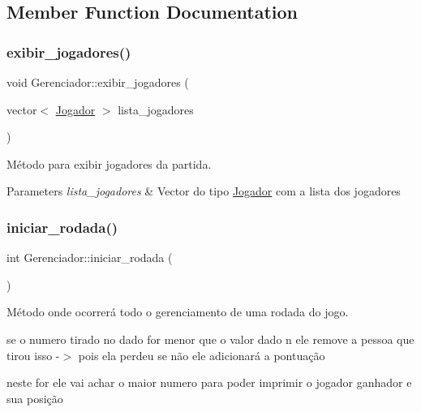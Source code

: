 \subsection{Member Function Documentation}
\mbox{\label{classGerenciador_ae26e87727d35b71dd43db8be0dbc77d2}} 
\subsubsection{\texorpdfstring{exibir\+\_\+jogadores()}{exibir\_jogadores()}}
{\footnotesize\ttfamily void Gerenciador\+::exibir\+\_\+jogadores (\begin{DoxyParamCaption}\item[{vector$<$ \hyperlink{classJogador}{Jogador} $>$}]{lista\+\_\+jogadores }\end{DoxyParamCaption})}



Método para exibir jogadores da partida. 


\begin{DoxyParams}{Parameters}
{\em lista\+\_\+jogadores} & Vector do tipo \hyperlink{classJogador}{Jogador} com a lista dos jogadores \\
\hline
\end{DoxyParams}
\mbox{\label{classGerenciador_a25a8afd36fd5a56265d50ce47be5c59e}} 
\subsubsection{\texorpdfstring{iniciar\+\_\+rodada()}{iniciar\_rodada()}}
{\footnotesize\ttfamily int Gerenciador\+::iniciar\+\_\+rodada (\begin{DoxyParamCaption}{ }\end{DoxyParamCaption})}



Método onde ocorrerá todo o gerenciamento de uma rodada do jogo. 

se o numero tirado no dado for menor que o valor dado n ele remove a pessoa que tirou isso -\/$>$ pois ela perdeu se não ele adicionará a pontuação

neste for ele vai achar o maior numero para poder imprimir o jogador ganhador e sua posição

